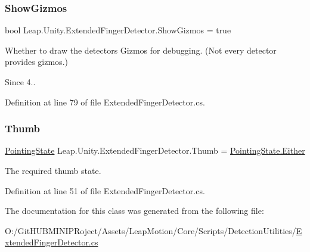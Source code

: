 \subsubsection{\texorpdfstring{ShowGizmos}{ShowGizmos}}
{\footnotesize\ttfamily bool Leap.\+Unity.\+Extended\+Finger\+Detector.\+Show\+Gizmos = true}

Whether to draw the detector\textquotesingle{}s Gizmos for debugging. (Not every detector provides gizmos.) \begin{DoxySince}{Since}
4.. 
\end{DoxySince}


Definition at line 79 of file Extended\+Finger\+Detector.\+cs.

\mbox{\label{class_leap_1_1_unity_1_1_extended_finger_detector_abf3b43c9d475e3241d6b1111c990d1de}} 
\subsubsection{\texorpdfstring{Thumb}{Thumb}}
{\footnotesize\ttfamily \mbox{\hyperlink{namespace_leap_1_1_unity_a1d316bf483102971171646a20de176fc}{Pointing\+State}} Leap.\+Unity.\+Extended\+Finger\+Detector.\+Thumb = \mbox{\hyperlink{namespace_leap_1_1_unity_a1d316bf483102971171646a20de176fca9e70a5d3dab1960c04b55a29f310331e}{Pointing\+State.\+Either}}}

The required thumb state. 

Definition at line 51 of file Extended\+Finger\+Detector.\+cs.



The documentation for this class was generated from the following file\+:\begin{DoxyCompactItemize}
\item 
O\+:/\+Git\+H\+U\+B\+M\+I\+N\+I\+P\+Roject/\+Assets/\+Leap\+Motion/\+Core/\+Scripts/\+Detection\+Utilities/\mbox{\hyperlink{_extended_finger_detector_8cs}{Extended\+Finger\+Detector.\+cs}}\end{DoxyCompactItemize}
